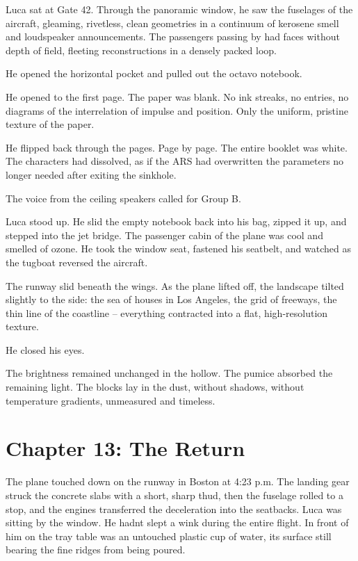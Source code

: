\documentclass[
  ngerman,
]{article}
\begin{document}
Luca sat at Gate 42. Through the panoramic window, he saw the fuselages
of the aircraft, gleaming, rivetless, clean geometries in a continuum of
kerosene smell and loudspeaker announcements. The passengers passing by
had faces without depth of field, fleeting reconstructions in a densely
packed loop.

He opened the horizontal pocket and pulled out the octavo notebook.

He opened to the first page. The paper was blank. No ink streaks, no
entries, no diagrams of the interrelation of impulse and position. Only
the uniform, pristine texture of the paper.

He flipped back through the pages. Page by page. The entire booklet was
white. The characters had dissolved, as if the ARS had overwritten the
parameters no longer needed after exiting the sinkhole.

The voice from the ceiling speakers called for Group B.

Luca stood up. He slid the empty notebook back into his bag, zipped it
up, and stepped into the jet bridge. The passenger cabin of the plane
was cool and smelled of ozone. He took the window seat, fastened his
seatbelt, and watched as the tugboat reversed the aircraft.

The runway slid beneath the wings. As the plane lifted off, the
landscape tilted slightly to the side: the sea of
\hspace{0pt}\hspace{0pt}houses in Los Angeles, the grid of freeways, the
thin line of the coastline -- everything contracted into a flat,
high-resolution texture.

He closed his eyes.

The brightness remained unchanged in the hollow. The pumice absorbed the
remaining light. The blocks lay in the dust, without shadows, without
temperature gradients, unmeasured and timeless.

\section{}\label{section-6}

\section{Chapter 13: The Return}\label{chapter-13-the-return}

The plane touched down on the runway in Boston at 4:23 p.m. The landing
gear struck the concrete slabs with a short, sharp thud, then the
fuselage rolled to a stop, and the engines transferred the deceleration
into the seatbacks. Luca was sitting by the window. He
hadn\textquotesingle t slept a wink during the entire flight. In front
of him on the tray table was an untouched plastic cup of water, its
surface still bearing the fine ridges from being poured.
\end{document}
